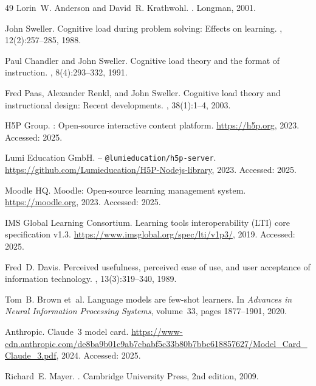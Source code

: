 \begin{thebibliography}{49}
Lorin~W. Anderson and David~R. Krathwohl.
.
\newblock Longman, 2001.

John Sweller.
\newblock Cognitive load during problem solving: Effects on learning.
, 12(2):257--285, 1988.

Paul Chandler and John Sweller.
\newblock Cognitive load theory and the format of instruction.
, 8(4):293--332, 1991.

Fred Paas, Alexander Renkl, and John Sweller.
\newblock Cognitive load theory and instructional design: Recent developments.
, 38(1):1--4, 2003.

{H5P Group}.
: Open-source interactive content platform.
\newblock \url{https://h5p.org}, 2023.
\newblock Accessed: 2025.

{Lumi Education GmbH}.
 -- \texttt{@lumieducation/h5p-server}.
\newblock \url{https://github.com/Lumieducation/H5P-Nodejs-library}, 2023.
\newblock Accessed: 2025.

{Moodle HQ}.
\newblock Moodle: Open-source learning management system.
\newblock \url{https://moodle.org}, 2023.
\newblock Accessed: 2025.

{IMS Global Learning Consortium}.
\newblock Learning tools interoperability ({LTI}) core specification v1.3.
\newblock \url{https://www.imsglobal.org/spec/lti/v1p3/}, 2019.
\newblock Accessed: 2025.

Fred~D. Davis.
\newblock Perceived usefulness, perceived ease of use, and user acceptance of information technology.
, 13(3):319--340, 1989.

Tom~B. Brown et~al.
\newblock Language models are few-shot learners.
\newblock In {\em Advances in Neural Information Processing Systems}, volume~33, pages 1877--1901, 2020.

{Anthropic}.
\newblock Claude~3 model card.
\newblock \url{https://www-cdn.anthropic.com/de8ba9b01c9ab7cbabf5c33b80b7bbc618857627/Model_Card_Claude_3.pdf}, 2024.
\newblock Accessed: 2025.

Richard~E. Mayer.
.
\newblock Cambridge University Press, 2nd edition, 2009.


\end{thebibliography}
